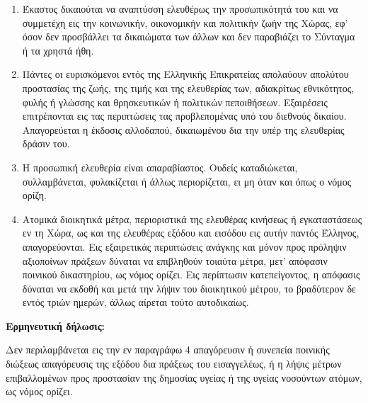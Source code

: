 \documentclass[twoside, a4paper, 10pt]{article}
\begin{document}
\begin{multicols}{2}
\begin{enumerate}
\begin{BigQuote}
\begin{enumerate}
  \item[1.] Έκαστος δικαιούται να αναπτύσση ελευθέρως την προσωπικότητά του και να συμμετέχη εις την κοινωνικήν, οικονομικήν και πολιτικήν ζωήν της Χώρας, εφ' όσον δεν προσβάλλει τα δικαιώματα των άλλων και δεν παραβιάζει το Σύνταγμα ή τα χρηστά ήθη.
  \item[2.] Πάντες οι ευρισκόμενοι εντός της Ελληνικής Επικρατείας απολαύουν απολύτου προστασίας της ζωής, της τιμής και της ελευθερίας των, αδιακρίτως εθνικότητος, φυλής ή γλώσσης και θρησκευτικών ή πολιτικών πεποιθήσεων. Εξαιρέσεις επιτρέπονται εις τας περιπτώσεις τας προβλεπομένας υπό του διεθνούς δικαίου.
Απαγορεύεται η έκδοσις αλλοδαπού, δικαιωμένου δια την υπέρ της ελευθερίας δράσιν του.
  \item[3.] Η προσωπική ελευθερία είναι απαραβίαστος. Ουδείς καταδιώκεται, συλλαμβάνεται, φυλακίζεται ή άλλως περιορίζεται, ει μη όταν και όπως ο νόμος ορίζη.
  \item[4.] Ατομικά διοικητικά μέτρα, περιοριστικά της ελευθέρας κινήσεως ή εγκαταστάσεως εν τη Χώρα, ως και της ελευθέρας εξόδου και εισόδου εις αυτήν παντός Έλληνος, απαγορεύονται. Εις εξαιρετικάς περιπτώσεις ανάγκης και μόνον προς πρόληψιν αξιοποίνων πράξεων δύναται να επιβληθούν τοιαύτα μέτρα, μετ' απόφασιν ποινικού δικαστηρίου, ως νόμος ορίζει. Εις περίπτωσιν κατεπείγοντος, η απόφασις δύναται να εκδοθή και μετά την λήψιν του διοικητικού μέτρου, το βραδύτερον δε εντός τριών ημερών, άλλως αίρεται τούτο αυτοδικαίως.

\end{enumerate}

\textbf{Ερμηνευτική δήλωσις:}

Δεν περιλαμβάνεται εις την εν παραγράφω 4 απαγόρευσιν ή συνεπεία ποινικής διώξεως απαγόρευσις της εξόδου δια πράξεως του εισαγγελέως, ή η λήψις μέτρων επιβαλλομένων προς προστασίαν της δημοσίας υγείας ή της υγείας νοσούντων ατόμων, ως νόμος ορίζει.


\end{BigQuote}
\end{enumerate}
\end{multicols}
\end{document}
